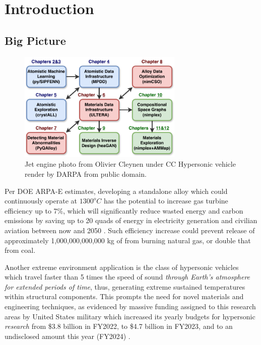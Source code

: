 \chapter{Introduction} \label{sec:Introduction}

\section{Big Picture} \label{intro:sec:bigpicture}




\begin{figure}[H]
    \centering
    \includegraphics[width=0.7\textwidth]{intro/DissertationOutline.pdf}
    \caption{
    Jet engine photo from Olivier Cleynen under CC
    Hypersonic vehicle render by DARPA from public domain.
    }
    \label{intro:fig:outline}
\end{figure}

Per DOE ARPA-E estimates, developing a standalone alloy which could continuously operate at $1300^oC$ has the potential to increase gas turbine efficiency up to 7\%, which will significantly reduce wasted energy and carbon emissions by saving up to 20 quads of energy in electricity generation and civilian aviation between now and 2050 \cite{ULTIMATEArpa-e.energy.gov}. Such efficiency increase could prevent release of approximately 1,000,000,000,000 kg of  from burning natural gas, or double that from coal.


Another extreme environment application is the class of hypersonic vehicles which travel faster than 5 times the speed of sound \emph{through Earth's atmosphere for extended periods of time}, thus, generating extreme sustained temperatures within structural components. This prompts the need for novel materials and engineering techniques, as evidenced by massive funding assigned to this research areas by United States military which increased its yearly budgets for hypersonic \emph{research} from \$3.8 billion in FY2022, to \$4.7 billion in FY2023, and to an undisclosed amount this year (FY2024) \cite{Sayler2024HypersonicCongress}.



